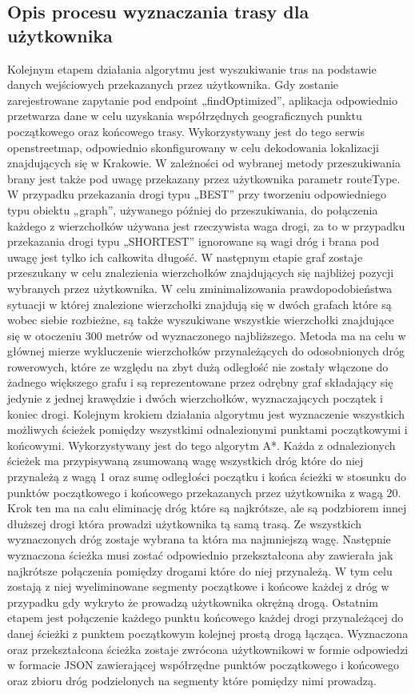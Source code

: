 \subsection{Opis procesu wyznaczania trasy dla użytkownika}

Kolejnym etapem działania algorytmu jest wyszukiwanie tras na podstawie danych wejściowych przekazanych przez użytkownika. Gdy zostanie zarejestrowane zapytanie pod endpoint „findOptimized”, aplikacja odpowiednio przetwarza dane w celu uzyskania współrzędnych geograficznych punktu początkowego oraz końcowego trasy. Wykorzystywany jest do tego serwis openstreetmap, odpowiednio skonfigurowany w celu dekodowania lokalizacji znajdujących się w Krakowie. W zależności od wybranej metody przeszukiwania brany jest także pod uwagę przekazany przez użytkownika parametr routeType. W przypadku przekazania drogi typu „BEST” przy tworzeniu odpowiedniego typu obiektu „graph”, używanego później do przeszukiwania, do połączenia każdego z wierzchołków używana jest rzeczywista waga drogi, za to w przypadku przekazania drogi typu „SHORTEST” ignorowane są wagi dróg i brana pod uwagę jest tylko ich całkowita długość.\newline
W następnym etapie graf zostaje przeszukany w celu znalezienia wierzchołków znajdujących się najbliżej pozycji wybranych przez użytkownika. W celu zminimalizowania prawdopodobieństwa sytuacji w której znalezione wierzchołki znajdują się w dwóch grafach które są wobec siebie rozbieżne, są także wyszukiwane wszystkie wierzchołki znajdujące się w otoczeniu 300 metrów od wyznaczonego najbliższego. Metoda ma na celu w głównej mierze wykluczenie wierzchołków przynależących do odosobnionych dróg rowerowych, które ze względu na zbyt dużą odległość nie zostały włączone do żadnego większego grafu i są reprezentowane przez odrębny graf składający się jedynie z jednej krawędzie i dwóch wierzchołków, wyznaczających początek i koniec drogi.
Kolejnym krokiem działania algorytmu jest wyznaczenie wszystkich możliwych ścieżek pomiędzy wszystkimi odnalezionymi punktami początkowymi i końcowymi. Wykorzystywany jest do tego algorytm A*. Każda z odnalezionych ścieżek ma przypisywaną zsumowaną wagę wszystkich dróg które do niej przynależą z wagą 1 oraz sumę odległości początku i końca ścieżki w stosunku do punktów początkowego i końcowego przekazanych przez użytkownika z wagą 20. Krok ten ma na calu eliminację dróg które są najkrótsze, ale są podzbiorem innej dłuższej drogi która prowadzi użytkownika tą samą trasą. Ze wszystkich wyznaczonych dróg zostaje wybrana ta która ma najmniejszą wagę.
Następnie wyznaczona ścieżka musi zostać odpowiednio przekształcona aby zawierała jak najkrótsze połączenia pomiędzy drogami które do niej przynależą. W tym celu zostają z niej wyeliminowane segmenty początkowe i końcowe każdej z dróg w przypadku gdy wykryto że prowadzą użytkownika okrężną drogą. Ostatnim etapem jest połączenie każdego punktu końcowego każdej drogi przynależącej do danej ścieżki z punktem początkowym kolejnej prostą drogą łącząca. \newline
Wyznaczona oraz przekształcona ścieżka zostaje zwrócona użytkownikowi w formie odpowiedzi w formacie JSON zawierającej współrzędne punktów początkowego i końcowego oraz zbioru dróg podzielonych na segmenty które pomiędzy nimi prowadzą.

